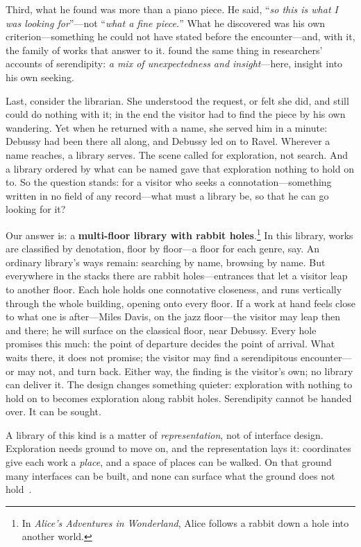 Third, what he found was more than a piano piece. He said, ``\textit{so this
    is what \emph{I} was looking for}''---not ``\textit{what a fine piece.}''
What he discovered was his own criterion---something he could not have stated
before the encounter---and, with it, the family of works that answer to it.
\citet{Makri2012684} found the same thing in researchers' accounts of
serendipity: \textit{a mix of unexpectedness and insight}---here, insight
into his own seeking.

Last, consider the librarian. She understood the request, or felt she did,
and still could do nothing with it; in the end the visitor had to find the
piece by his own wandering. Yet when he returned with a name, she served him
in a minute: Debussy had been there all along, and Debussy led on to Ravel.
Wherever a name reaches, a library serves. The scene called for exploration,
not search. And a library ordered by what can be named gave that exploration
nothing to hold on to. So the question stands: for a visitor who seeks a
connotation---something written in no field of any record---what must a
library be, so that he can go looking for it?

Our answer is: a \textbf{multi-floor library with rabbit holes}.\footnote{In
    \textit{Alice's Adventures in Wonderland}, Alice follows a rabbit down a hole
    into another world.} In this library, works are classified by denotation,
floor by floor---a floor for each genre, say. An ordinary library's ways
remain: searching by name, browsing by name. But everywhere in the stacks
there are rabbit holes---entrances that let a visitor leap to another floor.
Each hole holds one connotative closeness, and runs vertically through the
whole building, opening onto every floor. If a work at hand feels close to
what one is after---Miles Davis, on the jazz floor---the visitor may leap
then and there; he will surface on the classical floor, near Debussy. Every
hole promises this much: the point of departure decides the point of arrival.
What waits there, it does not promise; the visitor may find a serendipitous
encounter---or may not, and turn back. Either way, the finding is the
visitor's own; no library can deliver it. The design changes something
quieter: exploration with nothing to hold on to becomes exploration along
rabbit holes. Serendipity cannot be handed over. It can be sought.

A library of this kind is a matter of \emph{representation}, not of interface
design. Exploration needs ground to move on, and the representation lays it:
coordinates give each work a \emph{place}, and a space of places can be walked.
On that ground many interfaces can be built, and none can surface what the
ground does not hold~\citep{Munzner2009921}.


